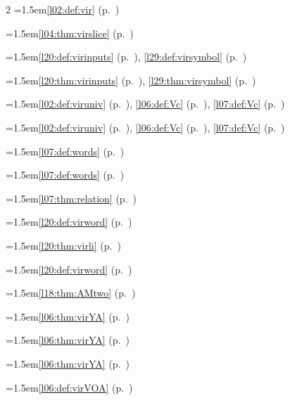 \begin{multicols}{2}
\hangindent=1.5em\quad \ref{l02:def:vir} (p.~\pageref{l02:def:vir})\par
\hangindent=1.5em\quad \ref{l04:thm:virslice} (p.~\pageref{l04:thm:virslice})\par
\hangindent=1.5em\quad \ref{l20:def:virinputs} (p.~\pageref{l20:def:virinputs}), \ref{l29:def:virsymbol} (p.~\pageref{l29:def:virsymbol})\par
\hangindent=1.5em\quad \ref{l20:thm:virinputs} (p.~\pageref{l20:thm:virinputs}), \ref{l29:thm:virsymbol} (p.~\pageref{l29:thm:virsymbol})\par
\hangindent=1.5em\quad \ref{l02:def:viruniv} (p.~\pageref{l02:def:viruniv}), \ref{l06:def:Vc} (p.~\pageref{l06:def:Vc}), \ref{l07:def:Vc} (p.~\pageref{l07:def:Vc})\par
\hangindent=1.5em\quad \ref{l02:def:viruniv} (p.~\pageref{l02:def:viruniv}), \ref{l06:def:Vc} (p.~\pageref{l06:def:Vc}), \ref{l07:def:Vc} (p.~\pageref{l07:def:Vc})\par
\hangindent=1.5em\quad \ref{l07:def:words} (p.~\pageref{l07:def:words})\par
\hangindent=1.5em\quad \ref{l07:def:words} (p.~\pageref{l07:def:words})\par
\hangindent=1.5em\quad \ref{l07:thm:relation} (p.~\pageref{l07:thm:relation})\par
\hangindent=1.5em\quad \ref{l20:def:virword} (p.~\pageref{l20:def:virword})\par
\hangindent=1.5em\quad \ref{l20:thm:virli} (p.~\pageref{l20:thm:virli})\par
\hangindent=1.5em\quad \ref{l20:def:virword} (p.~\pageref{l20:def:virword})\par
\hangindent=1.5em\quad \ref{l18:thm:AMtwo} (p.~\pageref{l18:thm:AMtwo})\par
\hangindent=1.5em\quad \ref{l06:thm:virYA} (p.~\pageref{l06:thm:virYA})\par
\hangindent=1.5em\quad \ref{l06:thm:virYA} (p.~\pageref{l06:thm:virYA})\par
\hangindent=1.5em\quad \ref{l06:thm:virYA} (p.~\pageref{l06:thm:virYA})\par
\hangindent=1.5em\quad \ref{l06:def:virVOA} (p.~\pageref{l06:def:virVOA})\par

\end{multicols}
